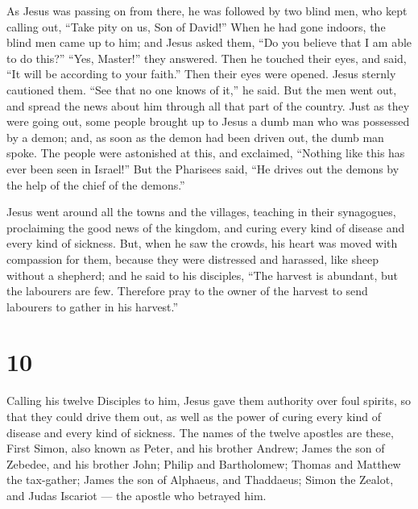  As Jesus was passing on from there, he was followed by two
blind men, who kept calling out, ``Take pity on us, Son of David!''
 When he had gone indoors, the blind men came up to him;
and Jesus asked them, ``Do you believe that I am able to do this?''
``Yes, Master!'' they answered.  Then he touched their
eyes, and said, ``It will be according to your faith.'' 
Then their eyes were opened. Jesus sternly cautioned them. ``See that no
one knows of it,'' he said.  But the men went out, and
spread the news about him through all that part of the country.
 Just as they were going out, some people brought up to
Jesus a dumb man who was possessed by a demon;  and, as
soon as the demon had been driven out, the dumb man spoke. The people
were astonished at this, and exclaimed, ``Nothing like this has ever
been seen in Israel!''  But the Pharisees said, ``He drives
out the demons by the help of the chief of the demons.''

 Jesus went around all the towns and the villages, teaching
in their synagogues, proclaiming the good news of the kingdom, and
curing every kind of disease and every kind of sickness. 
But, when he saw the crowds, his heart was moved with compassion for
them, because they were distressed and harassed, like sheep without a
shepherd;  and he said to his disciples, ``The harvest is
abundant, but the labourers are few.  Therefore pray to the
owner of the harvest to send labourers to gather in his harvest.''

\hypertarget{section-9}{%
\section{10}\label{section-9}}

 Calling his twelve Disciples to him, Jesus gave them
authority over foul spirits, so that they could drive them out, as well
as the power of curing every kind of disease and every kind of sickness.
 The names of the twelve apostles are these, First Simon,
also known as Peter, and his brother Andrew; James the son of Zebedee,
and his brother John;  Philip and Bartholomew; Thomas and
Matthew the tax-gather; James the son of Alphaeus, and Thaddaeus;
 Simon the Zealot, and Judas Iscariot --- the apostle who
betrayed him.

